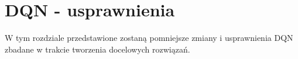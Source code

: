 \chapter{DQN - usprawnienia}
W tym rozdziale przedstawione zostaną pomniejsze zmiany i usprawnienia DQN zbadane w trakcie tworzenia docelowych rozwiązań.




